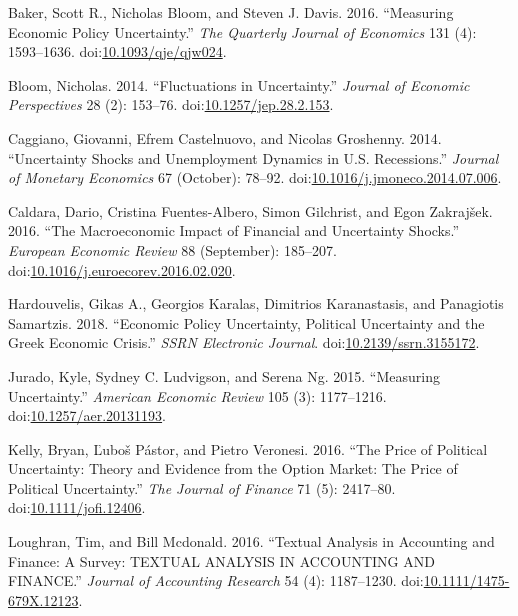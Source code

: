 \documentclass[11pt,preprint, authoryear]{elsarticle}
\numberwithin{equation}{section}
\numberwithin{figure}{section}
\numberwithin{table}{section}
\begin{document}
\hypertarget{ref-Baker2016}{}
Baker, Scott R., Nicholas Bloom, and Steven J. Davis. 2016. ``Measuring
Economic Policy Uncertainty.'' \emph{The Quarterly Journal of Economics}
131 (4): 1593--1636.
doi:\href{https://doi.org/10.1093/qje/qjw024}{10.1093/qje/qjw024}.

\hypertarget{ref-Bloom2014}{}
Bloom, Nicholas. 2014. ``Fluctuations in Uncertainty.'' \emph{Journal of
Economic Perspectives} 28 (2): 153--76.
doi:\href{https://doi.org/10.1257/jep.28.2.153}{10.1257/jep.28.2.153}.

\hypertarget{ref-Caggiano2014}{}
Caggiano, Giovanni, Efrem Castelnuovo, and Nicolas Groshenny. 2014.
``Uncertainty Shocks and Unemployment Dynamics in U.S. Recessions.''
\emph{Journal of Monetary Economics} 67 (October): 78--92.
doi:\href{https://doi.org/10.1016/j.jmoneco.2014.07.006}{10.1016/j.jmoneco.2014.07.006}.

\hypertarget{ref-Caldara2016}{}
Caldara, Dario, Cristina Fuentes-Albero, Simon Gilchrist, and Egon
Zakrajšek. 2016. ``The Macroeconomic Impact of Financial and Uncertainty
Shocks.'' \emph{European Economic Review} 88 (September): 185--207.
doi:\href{https://doi.org/10.1016/j.euroecorev.2016.02.020}{10.1016/j.euroecorev.2016.02.020}.

\hypertarget{ref-Hardouvelis2018}{}
Hardouvelis, Gikas A., Georgios Karalas, Dimitrios Karanastasis, and
Panagiotis Samartzis. 2018. ``Economic Policy Uncertainty, Political
Uncertainty and the Greek Economic Crisis.'' \emph{SSRN Electronic
Journal}.
doi:\href{https://doi.org/10.2139/ssrn.3155172}{10.2139/ssrn.3155172}.

\hypertarget{ref-Jurado2015}{}
Jurado, Kyle, Sydney C. Ludvigson, and Serena Ng. 2015. ``Measuring
Uncertainty.'' \emph{American Economic Review} 105 (3): 1177--1216.
doi:\href{https://doi.org/10.1257/aer.20131193}{10.1257/aer.20131193}.

\hypertarget{ref-Kelly2016}{}
Kelly, Bryan, Ľuboš Pástor, and Pietro Veronesi. 2016. ``The Price of
Political Uncertainty: Theory and Evidence from the Option Market: The
Price of Political Uncertainty.'' \emph{The Journal of Finance} 71 (5):
2417--80.
doi:\href{https://doi.org/10.1111/jofi.12406}{10.1111/jofi.12406}.

\hypertarget{ref-Loughran2016}{}
Loughran, Tim, and Bill Mcdonald. 2016. ``Textual Analysis in Accounting
and Finance: A Survey: TEXTUAL ANALYSIS IN ACCOUNTING AND FINANCE.''
\emph{Journal of Accounting Research} 54 (4): 1187--1230.
doi:\href{https://doi.org/10.1111/1475-679X.12123}{10.1111/1475-679X.12123}.
\end{document}
